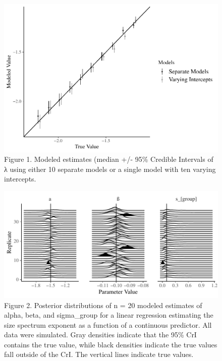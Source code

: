 \documentclass[
  12pt,
]{article}
\numberwithin{equation}
\begin{document}
\begin{figure}
\centering
\includegraphics{stan_spectra_manuscript_update_files/figure-latex/unnamed-chunk-3-1.pdf}
\caption{Figure 1. Modeled estimates (median +/- 95\% Credible Intervals
of λ using either 10 separate models or a single model with ten varying
intercepts.\label{single_and_varint_plot:plot}}
\end{figure}

\begin{figure}
\centering
\includegraphics{stan_spectra_manuscript_update_files/figure-latex/unnamed-chunk-4-1.pdf}
\caption{Figure 2. Posterior distributions of n = 20 modeled estimates
of alpha, beta, and sigma\_group for a linear regression estimating the
size spectrum exponent as a function of a continuous predictor. All data
were simulated. Gray densities indicate that the 95\% CrI contains the
true value, while black densities indicate the true values fall outside
of the CrI. The vertical lines indicate true
values.\label{plot_linear_model_bias :plot}}
\end{figure}
\end{document}
